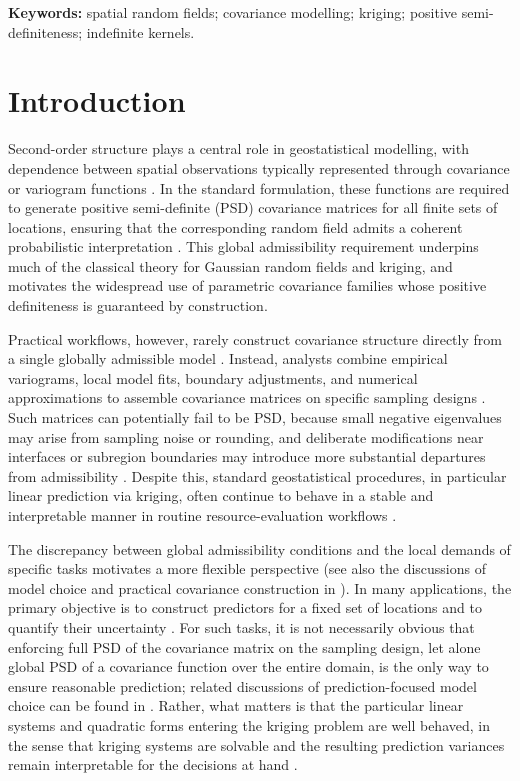 \documentclass[smallextended]{svjour3}
\newcommand{\1}{\mathbf{1}}
\begin{document}
\noindent\textbf{Keywords:} spatial random fields; covariance modelling; kriging; positive semi-definiteness; indefinite kernels.	

\section{Introduction}
	
%   
Second-order structure plays a central role in geostatistical modelling, with dependence between spatial observations typically represented through covariance or variogram functions \citep[e.g.][]{goovaerts1997,cressie1993}. In the standard formulation, these functions are required to generate positive semi-definite (PSD) covariance matrices for all finite sets of locations, ensuring that the corresponding random field admits a coherent probabilistic interpretation \citep{Bochner2005,yaglom1987}. This global admissibility requirement underpins much of the classical theory for Gaussian random fields and kriging, and motivates the widespread use of parametric covariance families whose positive definiteness is guaranteed by construction. 
 
Practical workflows, however, rarely construct covariance structure directly from a single globally admissible model \citep[e.g.][]{cressie1993}. Instead, analysts combine empirical variograms, local model fits, boundary adjustments, and numerical approximations to assemble covariance matrices on specific sampling designs \citep{isaaks1989,chilesdelfiner2012,Olea1999}. Such matrices can potentially fail to be PSD, because small negative eigenvalues may arise from sampling noise or rounding, and deliberate modifications near interfaces or subregion boundaries may introduce more substantial departures from admissibility \citep{Higham1988}. Despite this, standard geostatistical procedures, in particular linear prediction via kriging, often continue to behave in a stable and interpretable manner in routine resource-evaluation workflows \citep{chilesdelfiner2012,armstrong1998}.

The discrepancy between global admissibility conditions and the local demands of specific tasks motivates a more flexible perspective (see also the discussions of model choice and practical covariance construction in \citealp{stein1999,chilesdelfiner2012}). In many applications, the primary objective is to construct predictors for a fixed set of locations and to quantify their uncertainty \citep{cressie1993,armstrong1998}. For such tasks, it is not necessarily obvious that enforcing full PSD  of the covariance matrix on the sampling design, let alone global PSD of a covariance function over the entire domain, is the only way to ensure reasonable prediction; related discussions of prediction-focused model choice can be found in \citet{stein1999}. Rather, what matters is that the particular linear systems and quadratic forms entering the kriging problem are well behaved, in the sense that kriging systems are solvable and the resulting prediction variances remain interpretable for the decisions at hand \citep{goovaerts1997,chilesdelfiner2012}.
\end{document}
